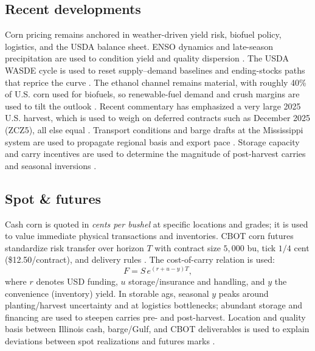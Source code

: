 \documentclass[11pt,a4paper]{article} %
\begin{document}
\subsection{Recent developments}
Corn pricing remains anchored in weather-driven yield risk, biofuel policy, logistics, and the USDA balance sheet. ENSO dynamics and late-season precipitation are used to condition yield and quality dispersion \citep{noaa_enso_discussion}. The USDA WASDE cycle is used to reset supply–demand baselines and ending-stocks paths that reprice the curve \citep{usda_wasde,usda_understanding_wasde}. The ethanol channel remains material, with roughly 40\% of U.S. corn used for biofuels, so renewable-fuel demand and crush margins are used to tilt the outlook \citep{ers_ethanol_40,ers_ethanol_2030}. Recent commentary has emphasized a very large 2025 U.S. harvest, which is used to weigh on deferred contracts such as December 2025 (ZCZ5), all else equal \citep{reuters_record_crop_2025,ers_feedgrains_outlook}. Transport conditions and barge drafts at the Mississippi system are used to propagate regional basis and export pace \citep{ams_gtr_2023}. Storage capacity and carry incentives are used to determine the magnitude of post-harvest carries and seasonal inversions \citep{ncga_storage_2025}.

\subsection{Spot \& futures}
Cash corn is quoted in \emph{cents per bushel} at specific locations and grades; it is used to value immediate physical transactions and inventories. CBOT corn futures standardize risk transfer over horizon \(T\) with contract size \(5{,}000\) bu, tick \(1/4\) cent (\$12.50/contract), and delivery rules \citep{barchart_zc_specs}. The cost-of-carry relation is used:
\[
F=S\,e^{(r+u-y)T},
\]
where \(r\) denotes USD funding, \(u\) storage/insurance and handling, and \(y\) the convenience (inventory) yield. In storable ags, seasonal \(y\) peaks around planting/harvest uncertainty and at logistics bottlenecks; abundant storage and financing are used to steepen carries pre- and post-harvest. Location and quality basis between Illinois cash, barge/Gulf, and CBOT deliverables is used to explain deviations between spot realizations and futures marks \citep{ams_gtr_2023}.
\end{document}
